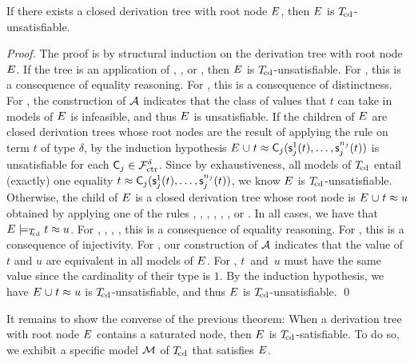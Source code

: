 \begin{theorem}%
\label{thm:rs}%
\afterDot
If there exists a closed derivation tree with root node\/ $E$, then\/ $E$ is $T_{\!\mathrm{cd}}$-unsatisfiable.
\end{theorem}
\begin{proof}
The proof is by structural induction on the derivation tree with root node $E$.
If the tree is an application of , , or ,
then $E$ is $T_{\!\mathrm{cd}}$-unsatisfiable.
For , this is a consequence of equality reasoning.
For , this is a consequence of distinctness.
For , the construction of $\mathcal{A}$ indicates that the class of values that $t$ can take in models of $E$ is infeasible,
and thus $E$ is unsatisfiable.
If the children of $E$ are closed derivation trees
whose root nodes are the result of applying the rule  on term $t$ of type $\delta$,
by the induction hypothesis $E \mathrel\cup t \approx \textsf{C}_j( \textsf{s}^1_j( t ), \ldots, \textsf{s}^{n_j}_j( t ) )$ is unsatisfiable
for each $\textsf{C}_j \in \mathcal{F}_{\mathrm{ctr}}^\delta$.
Since by exhaustiveness, all models of $T_{\!\mathrm{cd}}$ entail (exactly) one equality $t \approx \textsf{C}_j( \textsf{s}^1_j( t ), \ldots, \textsf{s}^{n_j}_j( t ) )$,
we know $E$ is $T_{\!\mathrm{cd}}$-unsatisfiable.
Otherwise, the child of $E$ is a closed derivation tree
whose root node is $E \mathrel\cup t \approx u$ obtained by applying one of the rules , , , , , , or .
In all cases, we have that $E \models_{T_{\!\mathrm{cd}}} t \approx u$.
For , , , , this is a consequence of equality reasoning.
For , this is a consequence of injectivity.
For , our construction of $\mathcal{A}$ indicates that the value of $t$ and $u$ are equivalent in all models of $E$.
For , $t$~and~$u$ must have the same value since the cardinality of their type is $1$.
By the induction hypothesis, we have $E \mathrel\cup t \approx u$ is $T_{\!\mathrm{cd}}$-unsatisfiable,
and thus $E$ is $T_{\!\mathrm{cd}}$-unsatisfiable.
\qed
\end{proof}

It remains to show the converse of the previous theorem: When a derivation tree
with root node $E$ contains a saturated node, then $E$ is
$T_{\!\mathrm{cd}}$-satisfiable.
To do so, we exhibit a specific model $\mathcal{M}$ of $T_{\!\mathrm{cd}}$ that satisfies $E$.

